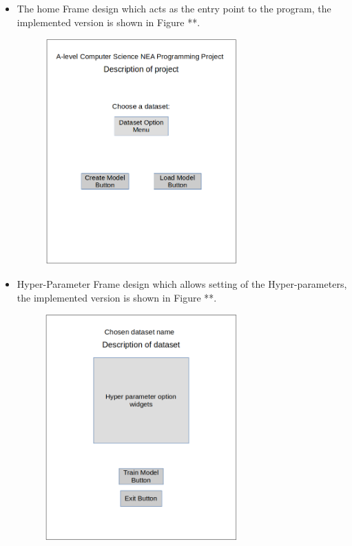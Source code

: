 \documentclass[./project-report/src/latex/project-report.tex]{subfiles}
\begin{document}
\begin{itemize}
    \item The home Frame design which acts as the entry point to the program, the implemented version is shown in Figure **.
        \begin{figure}[h!]
        \centering
        \includegraphics[width=0.7\textwidth]{./project-report/src/images/home-frame-design.png}
        \end{figure}

    \pagebreak

    \item Hyper-Parameter Frame design which allows setting of the Hyper-parameters, the implemented version is shown in Figure **.
        \begin{figure}[h!]
        \centering
        \includegraphics[width=0.7\textwidth]{./project-report/src/images/hyper-parameter-frame-design.png}
        \end{figure}


\end{itemize}
\end{document}

